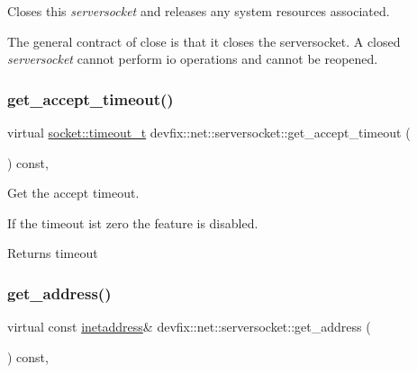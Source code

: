 Closes this {\itshape serversocket} and releases any system resources associated. 

The general contract of close is that it closes the serversocket. A closed {\itshape serversocket} cannot perform io operations and cannot be reopened. \mbox{\label{structdevfix_1_1net_1_1serversocket_acde0979277bf9536f54bb0fb6a9cc881}} 
\subsubsection{\texorpdfstring{get\+\_\+accept\+\_\+timeout()}{get\_accept\_timeout()}}
{\footnotesize\ttfamily virtual \hyperlink{structdevfix_1_1net_1_1socket_a80a3bf4cb7292bae31ea9c6575539c68}{socket\+::timeout\+\_\+t} devfix\+::net\+::serversocket\+::get\+\_\+accept\+\_\+timeout (\begin{DoxyParamCaption}{ }\end{DoxyParamCaption}) const\hspace{0.3cm}{\ttfamily [pure virtual]}, {\ttfamily [noexcept]}}



Get the accept timeout. 

If the timeout ist zero the feature is disabled. \begin{DoxyReturn}{Returns}
timeout 
\end{DoxyReturn}
\mbox{\label{structdevfix_1_1net_1_1serversocket_a087a819b8173bfa101ea65ea8a17eb8c}} 
\subsubsection{\texorpdfstring{get\+\_\+address()}{get\_address()}}
{\footnotesize\ttfamily virtual const \hyperlink{structdevfix_1_1net_1_1inetaddress}{inetaddress}\& devfix\+::net\+::serversocket\+::get\+\_\+address (\begin{DoxyParamCaption}{ }\end{DoxyParamCaption}) const\hspace{0.3cm}{\ttfamily [pure virtual]}, {\ttfamily [noexcept]}}



